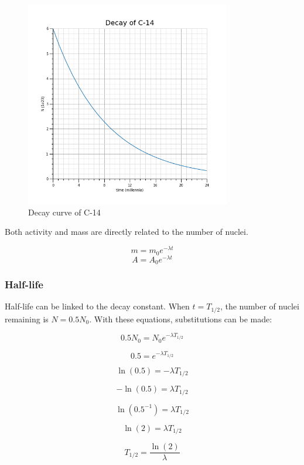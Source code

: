 \documentclass[12pt]{article}
\begin{document}
\begin{figure}[H]
\centering
\includegraphics[width=0.8\textwidth,keepaspectratio]{./images/c-14_decay.png}
\caption{Decay curve of C-14}
\end{figure}

Both activity and mass are directly related to the number of nuclei.

\[m = m_0 e^{- \lambda t}\]
\[A = A_0 e^{- \lambda t}\]

\subsubsection{Half-life}
\label{sec:org08d5a24}

Half-life can be linked to the decay constant. When \(t= T_{1/2}\), the number of nuclei remaining is \(N = 0.5N_0\). With these equations, substitutions can be made:

\[0.5N_0 = N_0 e^{-\lambda T_{1/2}}\]

\[0.5 = e^{-\lambda T_{1/2}}\]

\[\ln (0.5) = -\lambda T_{1/2}\]

\[-\ln (0.5) = \lambda T_{1/2}\]

\[\ln (0.5^{-1}) = \lambda T_{1/2}\]

\[\ln (2) = \lambda T_{1/2}\]

\[T_{1/2} = \dfrac{\ln(2)}{\lambda}\]
\end{document}

